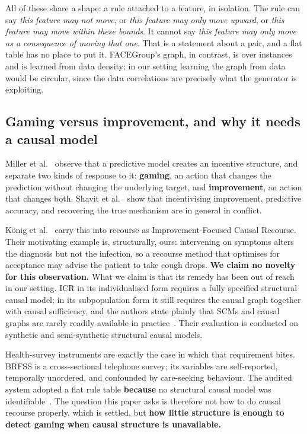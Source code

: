 \documentclass[conference]{IEEEtran}
\begin{document}
All of these share a shape: a rule attached to a feature, in isolation. The rule can say \emph{this feature may not move}, or \emph{this feature may only move upward}, or \emph{this feature may move within these bounds}. It cannot say \emph{this feature may only move as a consequence of moving that one}. That is a statement about a pair, and a flat table has no place to put it. FACEGroup's graph, in contrast, is over instances and is learned from data density; in our setting learning the graph from data would be circular, since the data correlations are precisely what the generator is exploiting.

\subsection{Gaming versus improvement, and why it needs a causal model}
Miller et al.~\cite{miller2020} observe that a predictive model creates an incentive structure, and separate two kinds of response to it: \textbf{gaming}, an action that changes the prediction without changing the underlying target, and \textbf{improvement}, an action that changes both. Shavit et al.~\cite{shavit2020} show that incentivising improvement, predictive accuracy, and recovering the true mechanism are in general in conflict.

K\"onig et al.~\cite{konig2023} carry this into recourse as Improvement-Focused Causal Recourse. Their motivating example is, structurally, ours: intervening on symptoms alters the diagnosis but not the infection, so a recourse method that optimises for acceptance may advise the patient to take cough drops. \textbf{We claim no novelty for this observation.} What we claim is that its remedy has been out of reach in our setting. ICR in its individualised form requires a fully specified structural causal model; in its subpopulation form it still requires the causal graph together with causal sufficiency, and the authors state plainly that SCMs and causal graphs are rarely readily available in practice~\cite{konig2023}. Their evaluation is conducted on synthetic and semi-synthetic structural causal models.

Health-survey instruments are exactly the case in which that requirement bites. BRFSS is a cross-sectional telephone survey; its variables are self-reported, temporally unordered, and confounded by care-seeking behaviour. The audited system adopted a flat rule table \textbf{because} no structural causal model was identifiable~\cite{thieu2026}. The question this paper asks is therefore not how to do causal recourse properly, which is settled, but \textbf{how little structure is enough to detect gaming when causal structure is unavailable.}
\end{document}
